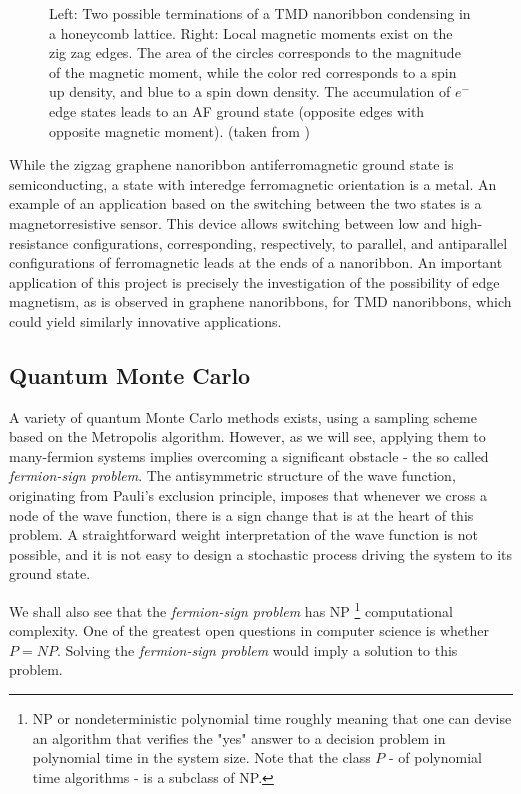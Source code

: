 \documentclass[10pt, twocolumn, twoside]{article}
\begin{document}
\begin{figure}[ht!]
\begin{minipage}[c]{0.1\textwidth}
\end{minipage}
 \caption{Left: Two possible terminations of a TMD nanoribbon condensing in a honeycomb lattice. Right: Local magnetic moments exist on the zig zag edges. The area of the circles corresponds to the magnitude of the magnetic moment, while the color red corresponds to a spin up density, and blue to a spin down density. The accumulation of $e^-$ edge states leads to an AF ground state (opposite edges with opposite magnetic moment). (taken from \cite{yazyev}) \label{fig:nanoribbons}}
\end{figure}

While the zigzag graphene nanoribbon antiferromagnetic ground state is semiconducting, a state with interedge ferromagnetic orientation is a metal. An example of an application based on the switching between the two states is a magnetorresistive sensor. This device allows switching between low and high-resistance configurations, corresponding, respectively, to parallel, and antiparallel configurations of ferromagnetic leads at the ends of a nanoribbon. An important application of this project is precisely the investigation of the possibility of edge magnetism, as is observed in graphene nanoribbons, for TMD nanoribbons, which could yield similarly innovative applications.


\subsection*{Quantum Monte Carlo}

A variety of quantum Monte Carlo methods exists, using a sampling scheme based on the Metropolis algorithm. However, as we will see, applying them to many-fermion systems implies overcoming a significant obstacle - the so called \emph{fermion-sign problem}. The antisymmetric structure of the wave function, originating from Pauli's exclusion principle, imposes that whenever we cross a node of the wave function, there is a sign change that is at the heart of this problem. A straightforward weight interpretation of the wave function is not possible, and it is not easy to design a stochastic process driving the system to its ground state.\par

We shall also see that the \emph{fermion-sign problem} has NP \footnote{NP or nondeterministic polynomial time roughly meaning that one can devise an algorithm that verifies the "yes" answer to a decision problem in polynomial time in the system size. Note that the class $P$ - of polynomial time algorithms - is a subclass of NP.} computational complexity. One of the greatest open questions in computer science is whether $P = NP$. Solving the \emph{fermion-sign problem} would imply a solution to this problem.\par
\end{document}
